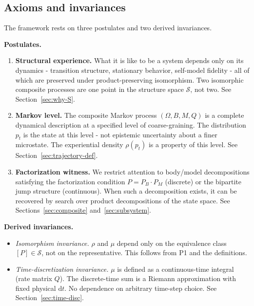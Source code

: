 \documentclass[12pt]{article}
\theoremstyle{remark}
\begin{document}

\subsection{Axioms and invariances}

The framework rests on three postulates and two derived invariances.

\medskip\noindent\textbf{Postulates.}

\begin{enumerate}[label=\textbf{P\arabic*.},leftmargin=3em]
\item \textbf{Structural experience.} What it is like to be a system depends only on its dynamics - transition structure, stationary behavior, self-model fidelity - all of which are preserved under product-preserving isomorphism. Two isomorphic composite processes are one point in the structure space $\mathcal{S}$, not two. See Section~\ref{sec:why-S}.

\item \textbf{Markov level.} The composite Markov process $(\Omega, B, M, Q)$ is a complete dynamical description at a specified level of coarse-graining. The distribution $p_t$ is the state at this level - not epistemic uncertainty about a finer microstate. The experiential density $\rho(p_t)$ is a property of this level. See Section~\ref{sec:trajectory-def}.

\item \textbf{Factorization witness.} We restrict attention to body/model decompositions satisfying the factorization condition $P = P_B \cdot P_M$ (discrete) or the bipartite jump structure (continuous). When such a decomposition exists, it can be recovered by search over product decompositions of the state space. See Sections~\ref{sec:composite} and~\ref{sec:subsystem}.
\end{enumerate}

\noindent\textbf{Derived invariances.}
\begin{itemize}[leftmargin=2em]
\item \emph{Isomorphism invariance.} $\rho$ and $\mu$ depend only on the equivalence class $[P] \in \mathcal{S}$, not on the representative. This follows from P1 and the definitions.
\item \emph{Time-discretization invariance.} $\mu$ is defined as a continuous-time integral (rate matrix $Q$). The discrete-time sum is a Riemann approximation with fixed physical $\mathrm{d}t$. No dependence on arbitrary time-step choice. See Section~\ref{sec:time-disc}.
\end{itemize}
\end{document}
